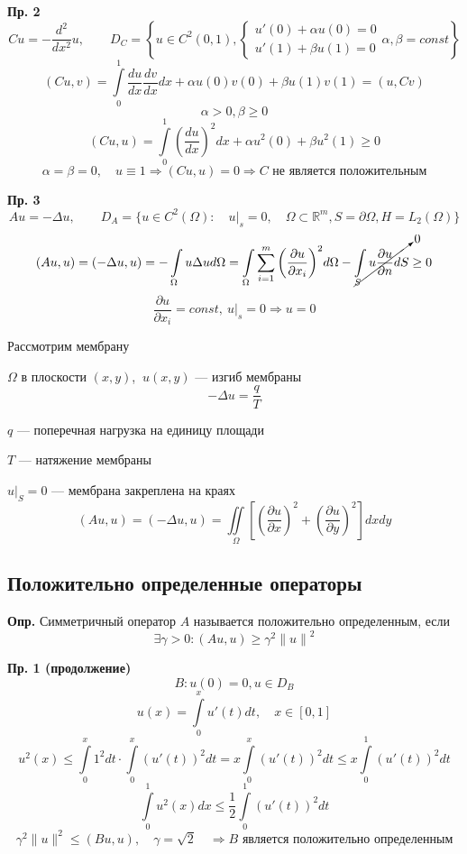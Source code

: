 \documentclass[12pt, a4paper]{article}
\begin{document}
\textbf{Пр. 2}
\[ Cu = - \frac{ d^2 }{dx^2 }u, \qquad D_C = \left\{ u \in C^2(0,1),
	\begin{cases}
		u'(0)+\alpha u(0)=0 \\
		u'(1)+\beta u(1)=0
	\end{cases}
	\alpha, \beta = const
\right\}
\]
\[(Cu, v) = \int\limits_{0}^{1} \frac{du}{dx} \frac{dv}{dx} dx + \alpha u(0)v(0) + \beta u(1)v(1) = (u, Cv)\]
\[\alpha > 0, \beta \geq 0\]
\[(Cu, u) = \int\limits_{0}^{1} {\left(\frac{du}{dx}\right)}^2 dx + \alpha u^2(0) + \beta u^2(1) \geq 0\]
\[\alpha = \beta = 0, \quad u \equiv 1 \Rightarrow (Cu, u) = 0 \Rightarrow C \text{ не является положительным}\]

\textbf{Пр. 3}
\[ Au = - \Delta u , \qquad D_A = \{ u \in C^2(\Omega): \quad u|_s = 0, \quad \Omega \subset \mathbb{R}^m, S = \partial \Omega, H = L_2(\Omega) \} \]
\[ (Au, u) = (-\Delta u, u ) = - \int\limits_{\Omega }^{} u \Delta u d \Omega = \int\limits_{\Omega }^{} \sum_{i = 1}^{m } {\left(\frac{\partial u }{\partial x_i }\right)}^2 d\Omega - \cancelto{0}{\int\limits_{S }^{} u \frac{\partial u }{\partial n } dS}  \geq 0 \]
\[ \frac{\partial u }{\partial x_i } = const, \ u|_s = 0 \Rightarrow u = 0 \]

\newpage

Рассмотрим мембрану

$\Omega$ в плоскости $(x,y)$, $\ u(x,y)$ --- изгиб мембраны
\[ - \Delta u = \frac{q}{T} \]

$q$ --- поперечная нагрузка на единицу площади

$T$ --- натяжение мембраны

$ {u|}_S = 0 $ --- мембрана закреплена на краях
\[ (A u , u) = (- \Delta u , u) = \iint\limits_{\Omega} \left[ \left(\frac{\partial u }{\partial x }\right)^2 + \left(\frac{ \partial u }{\partial y }\right)^2 \right] dx dy  \]

\subsection{Положительно определенные операторы}

\textbf{Опр.} Симметричный оператор $A$ называется положительно определенным, если
\begin{equation}
	\exists \gamma > 0 : (Au, u) \geq \gamma^2 {\|u\|}^2
\end{equation}

\textbf{Пр. 1 (продолжение)}
\[ B: u(0) = 0, u \in D_B \]
\[ u(x) = \int\limits_{0}^{x } u'(t) dt, \quad x \in [0, 1] \]
\[ u^2(x) \leq \int\limits_{0}^{x} 1^2 dt \cdot \int\limits_{0}^{x} {(u'(t))}^2 dt = x \int\limits_{0}^{x} {(u'(t))}^2 dt \leq x \int\limits_{0}^{1} {(u'(t))}^2 dt \]
\[ \int\limits_{0}^{1} u^2 (x) dx \leq \frac{1}{2} \int\limits_{0}^{1} {(u'(t))}^2 dt \]
\[ \gamma^2 \|u\|^2 \leq (Bu, u) , \quad \gamma = \sqrt{2} \quad \Rightarrow B \text{ является положительно определенным} \]
\end{document}
